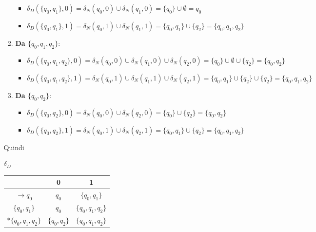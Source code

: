 \documentclass[12pt, a4paper]{report}
\begin{document}
\begin{example}{}
\begin{itemize}
\begin{itemize}
\begin{enumerate}
\begin{itemize}
                                    \item $\delta_D(\{q_0,q_1\},0)=\delta_N(q_0,0)\cup \delta_N(q_1,0)=\{q_0\}\cup\emptyset=q_0$
                                    \item $\delta_D(\{q_0,q_1\},1)=\delta_N(q_0,1)\cup \delta_N(q_1,1)=\{q_0,q_1\}\cup\{q_2\}=\{q_0,q_1,q_2\}$ 
                                \end{itemize}
                                \item \textbf{Da $\{q_0,q_1,q_2\}$}: \begin{itemize}
                                    \item $\delta_D(\{q_0,q_1,q_2\},0)=\delta_N(q_0,0)\cup \delta_N(q_1,0)\cup\delta_N(q_2,0)=\{q_0\}\cup\emptyset\cup\{q_2\}=\{q_0,q_2\}$
                                    \item $\delta_D(\{q_0,q_1,q_2\},1)=\delta_N(q_0,1)\cup \delta_N(q_1,1)\cup\delta_N(q_2,1)=\{q_0,q_1\}\cup\{q_2\}\cup\{q_2\}=\{q_0,q_1,q_2\}$
                                \end{itemize}
                                \item \textbf{Da $\{q_0,q_2\}$}: \begin{itemize}
                                    \item $\delta_D(\{q_0,q_2\},0)=\delta_N(q_0,0)\cup \delta_N(q_2,0)=\{q_0\}\cup\{q_2\}=\{q_0,q_2\}$
                                    \item $\delta_D(\{q_0,q_2\},1)=\delta_N(q_0,1)\cup \delta_N(q_2,1)=\{q_0,q_1\}\cup\{q_2\}=\{q_0,q_1,q_2\}$
                                \end{itemize}
                            \end{enumerate}
                            Quindi \begin{center}
                                $\delta_D=$ \begin{tabular}{|c|c|c|}
                                \hline
                                & 0 & 1 \\
                                \hline
                                $\to q_0$ & $q_0$ & $\{q_0,q_1\}$\\
                                \hline
                                $\{q_0,q_1\}$ & $q_0$ & $\{q_0,q_1,q_2\}$\\
                                \hline
                                $*\{q_0,q_1,q_2\}$ & $\{q_0,q_2\}$ & $\{q_0,q_1,q_2\}$\\
                                \hline

\end{tabular}
\end{center}
\end{itemize}
\end{itemize}
\end{example}
\end{document}
